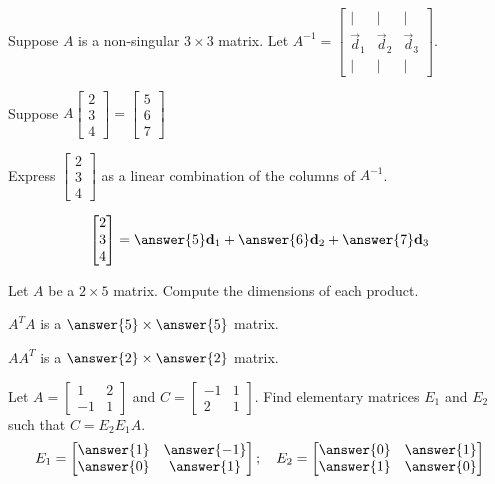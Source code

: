 \documentclass{ximera}
\begin{document}
\begin{exercise}
Suppose $A$ is a non-singular $3\times 3$ matrix.  Let $A^{-1}=\begin{bmatrix}|&|&|\\\vec{d}_1& \vec{d}_2 & \vec{d}_3\\|&|&|\end{bmatrix}$.
 
Suppose $A\begin{bmatrix}2\\3\\4\end{bmatrix}=\begin{bmatrix}5\\6\\7\end{bmatrix}$
 
Express $\begin{bmatrix}2\\3\\4\end{bmatrix}$ as a linear combination of the columns of $A^{-1}$.
 
$$\begin{bmatrix}2\\3\\4\end{bmatrix}=\answer{5}\vec{d}_1+\answer{6}\vec{d}_2+\answer{7}\vec{d}_3$$
\end{exercise}

\begin{exercise}
Let $A$ be a $2\times 5$ matrix.  Compute the dimensions of each product.
 
$A^TA$ is a $\answer{5}\times \answer{5}$ matrix.
 
$AA^T$ is a $\answer{2}\times \answer{2}$ matrix.
 
 \end{exercise}

 \begin{exercise}
Let $A=\begin{bmatrix}1 & 2\\-1 & 1\end{bmatrix}$ and $C=\begin{bmatrix}-1 & 1\\2 & 1\end{bmatrix}$.  Find elementary matrices $E_1$ and $E_2$ such that $C=E_2E_1A$.
$$E_1=\begin{bmatrix}\answer{1} & \answer{-1}\\\answer{0} & \answer{1}\end{bmatrix};\quad E_2=\begin{bmatrix}\answer{0} & \answer{1}\\\answer{1} & \answer{0}\end{bmatrix}$$
 
 \end{exercise}
\end{document}
